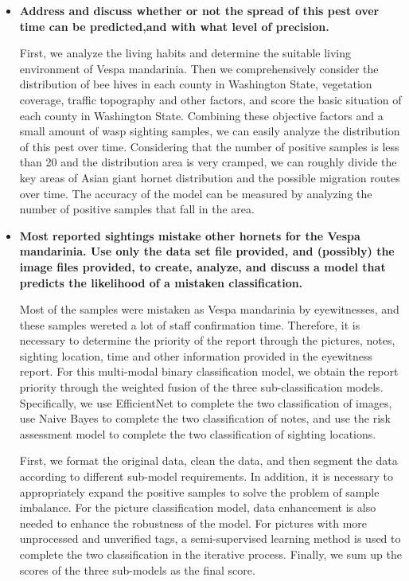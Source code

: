 \documentclass{mcmthesis}
\numberwithin{figure}{section}
\numberwithin{table}{section}
\begin{document}
\begin{itemize}
  \item \textbf{Address and discuss whether or not the spread of this pest over time can be predicted,and with what level of precision.}
  
First, we analyze the living habits and determine the suitable living environment of Vespa mandarinia. Then we comprehensively consider the distribution of bee hives in each county in Washington State, vegetation coverage, traffic topography and other factors, and score the basic situation of each county in Washington State. Combining these objective factors and a small amount of wasp sighting samples, we can easily analyze the distribution of this pest over time. Considering that the number of positive samples is less than 20 and the distribution area is very cramped, we can roughly divide the key areas of Asian giant hornet distribution and the possible migration routes over time. The accuracy of the model can be measured by analyzing the number of positive samples that fall in the area.
  
  \item \textbf{Most reported sightings mistake other hornets for the Vespa mandarinia. Use only the data set file provided, and (possibly) the image files provided, to create, analyze, and discuss a model that predicts the likelihood of a mistaken classification.}

Most of the samples were mistaken as Vespa mandarinia by eyewitnesses, and these samples wereted a lot of staff confirmation time. Therefore, it is necessary to determine the priority of the report through the pictures, notes, sighting location, time and other information provided in the eyewitness report. For this multi-modal binary classification model, we obtain the report priority through the weighted fusion of the three sub-classification models. Specifically, we use EfficientNet to complete the two classification of images, use Naive Bayes to complete the two classification of notes, and use the risk assessment model to complete the two classification of sighting locations. 
  
First, we format the original data, clean the data, and then segment the data according to different sub-model requirements. In addition, it is necessary to appropriately expand the positive samples to solve the problem of sample imbalance. For the picture classification model, data enhancement is also needed to enhance the robustness of the model. For pictures with more unprocessed and unverified tags, a semi-supervised learning method is used to complete the two classification in the iterative process. Finally, we sum up the scores of the three sub-models as the final score.



\end{itemize}
\end{document}
